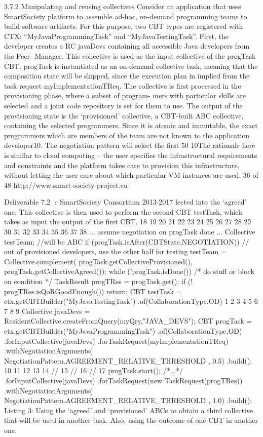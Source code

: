 3.7.2 Manipulating and reusing collectives
Consider an application that uses SmartSociety platform to assemble ad-hoc, on-demand programming teams to build software artifacts. For this purpose, two CBT types are registered with CTX: “MyJavaProgrammingTask” and “MyJavaTestingTask”. First, the developer creates a RC javaDevs containing all accessible Java developers from the Peer- Manager. This collective is used as the input collective of the progTask CBT. progTask is instantiated as an on-demand collective task, meaning that the composition state will be skipped, since the execution plan in implied from the task request myImplementationTReq.
The collective is first processed in the provisioning phase, where a subset of program- mers with particular skills are selected and a joint code repository is set for them to use. The output of the provisioning state is the ‘provisioned’ collective, a CBT-built ABC collective, containing the selected programmers. Since it is atomic and immutable, the exact programmers which are members of the team are not known to the application developer10.
The negotiation pattern will select the first 50%
10The rationale here is similar to cloud computing – the user specifies the infrastructural requirements and constraints and the platform takes care to provision this infrastructure, without letting the user care about which particular VM instances are used.
36 of 48 http://www.smart-society-project.eu
  
Deliverable 7.2 ⃝c SmartSociety Consortium 2013-2017
lected into the ‘agreed’ one. This collective is then used to perform the second CBT testTask, which takes as input the output of the first CBT.
  18
19
20
21
22
23
24
25
26
27
28
29
30
31
32
33
34
35
36
37
38
...
assume negotiation on progTask done ...
Collective testTeam; //will be ABC
if (progTask.isAfter(CBTState.NEGOTIATION)) {
// out of provisioned developers, use the other half for testing
testTeam = Collective.complement(
progTask.getCollectiveProvisioned(), progTask.getCollectiveAgreed());
}
while (!progTask.isDone()) { /* do stuff or block on condition */} TaskResult progTRes = progTask.get();
if (! progTRes.isQoRGoodEnough()) return;
CBT testTask = ctx.getCBTBuilder("MyJavaTestingTask") .of(CollaborationType.OD)
1 2 3 4 5 6 7 8 9
Collective javaDevs = ResidentCollective.createFromQuery(myQry,"JAVA_DEVS");
CBT progTask = ctx.getCBTBuilder("MyJavaProgrammingTask") .of(CollaborationType.OD)
.forInputCollective(javaDevs) .forTaskRequest(myImplementationTReq) .withNegotiationArguments(
NegotiationPattern.AGREEMENT_RELATIVE_THRESHOLD , 0.5) .build();
10
11
12
13
14 // 15 // 16 // 17
progTask.start();
/*...*/
.forInputCollective(javaDevs) .forTaskRequest(new TaskRequest(progTRes)) .withNegotiationArguments(
NegotiationPattern.AGREEMENT_RELATIVE_THRESHOLD , 1.0) .build();
 Listing 3: Using the ‘agreed’ and ‘provisioned’ ABCs to obtain a third collective that will be used in another task. Also, using the outcome of one CBT in another one.


